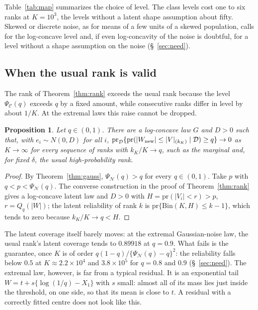 \documentclass[12pt]{article}
\newtheorem{proposition}{Proposition}
\theoremstyle{definition}
\newcommand{\pr}{\mathrm{pr}}
\newcommand{\E}{\mathcal{C}}
\newcommand{\N}{\mathcal{N}}
\newcommand{\Bin}{\mathrm{Bin}}
\begin{document}
Table~\ref{tab:map} summarizes the choice of level. The class levels cost one to six ranks at $K = 10^3$, the levels without a latent shape assumption about fifty. Skewed or discrete noise, as for means of a few units of a skewed population, calls for the log-concave level and, if even log-concavity of the noise is doubtful, for a level without a shape assumption on the noise (\S~\ref{sec:need}).


\subsection{When the usual rank is valid}\label{sec:usual}

The rank of Theorem~\ref{thm:rank} exceeds the usual rank because the level $\Psi_{\E}(q)$ exceeds $q$ by a fixed amount, while consecutive ranks differ in level by about $1/K$. At the extremal laws this raise cannot be dropped.

\begin{proposition}\label{prop:fail}
Let $q \in (0,1)$. There are a log-concave law $G$ and $D > 0$ such that, with $e_i \sim N(0, D)$ for all $i$, $\pr_{\mathcal D}\{\pr(|W_{\rm new}| \le |V|_{(k_K)} \mid \mathcal D) \ge q\} \to 0$ as $K \to \infty$ for every sequence of ranks with $k_K/K \to q$, such as the marginal and, for fixed $\delta$, the usual high-probability rank.
\end{proposition}

\begin{proof}
By Theorem~\ref{thm:gauss}, $\Psi_{\N}(q) > q$ for every $q \in (0, 1)$. Take $p$ with $q < p < \Psi_{\N}(q)$. The converse construction in the proof of Theorem~\ref{thm:rank} gives a log-concave latent law and $D > 0$ with $H = \pr(|V_i| < r) > p$, $r = Q_q(|W|)$; the latent reliability of rank $k$ is $\pr\{\Bin(K, H) \le k - 1\}$, which tends to zero because $k_K/K \to q < H$.
\end{proof}

The latent coverage itself barely moves: at the extremal Gaussian-noise law, the usual rank's latent coverage tends to $0.89918$ at $q = 0.9$. What fails is the guarantee, once $K$ is of order $q(1 - q)/\{\Psi_{\N}(q) - q\}^2$: the reliability falls below $0.5$ at $K \approx 2.2 \times 10^4$ and $3.8 \times 10^5$ for $q = 0.8$ and $0.9$ (\S~\ref{sec:need}). The extremal law, however, is far from a typical residual. It is an exponential tail $W = t + s\{\log(1/q) - X_1\}$ with $s$ small: almost all of its mass lies just inside the threshold, on one side, so that its mean is close to $t$. A residual with a correctly fitted centre does not look like this.
\end{document}
